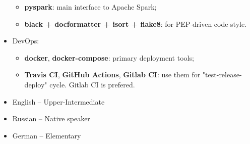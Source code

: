 \begin{itemize}
\begin{itemize}
            \item \textbf{pyspark}: main interface to Apache Spark;
            \item \textbf{black + docformatter + isort + flake8}: for PEP-driven code style.
        \end{itemize}
    \item DevOps: 
        \begin{itemize}
            \item \textbf{docker}, \textbf{docker-compose}: primary deployment tools;
            \item \textbf{Travis CI}, \textbf{GitHub Actions}, \textbf{Gitlab CI}: use them for "test-release-deploy" cycle. Gitlab CI is prefered.
        \end{itemize}
\end{itemize}








\begin{itemize}
	\item English -- Upper-Intermediate
	\item Russian -- Native speaker
    \item German -- Elementary
\end{itemize}

